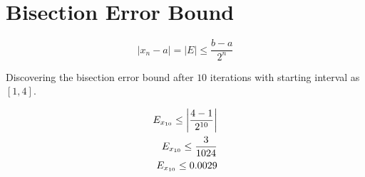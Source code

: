 \section{Bisection Error Bound}

	\begin{equation}
		|x_{n} - a| = |E| \le \frac{b-a}{2^{n}}
	\label{eq:bisectionerrorbound}
	\end{equation}

	Discovering the bisection error bound after $10$ iterations with starting interval as $[1,4]$.

	\begin{align}
		E_{x_{10}} \le \left|\frac{4-1}{2^{10}}\right| \notag \\
		E_{x_{10}} \le \frac{3}{1024} \notag \\
		E_{x_{10}} \le 0.0029
	\label{eq:36}
	\end{align}